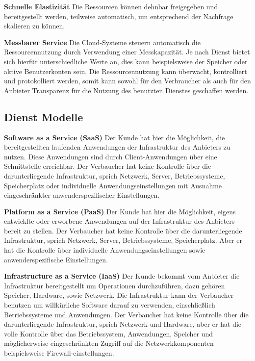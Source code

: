 \textbf{Schnelle Elastizität} \hfill
Die Ressourcen können dehnbar freigegeben und bereitgestellt werden, teilweise automatisch, um entsprechend der Nachfrage skalieren zu können\cite{nist_definition}.

\textbf{Messbarer Service} \hfill
Die Cloud-Systeme steuern automatisch die Ressourcennutzung durch Verwendung einer Messkapazität. Je nach Dienst bietet sich hierfür unterschiedliche Werte an, dies kann beispielsweise der Speicher oder aktive Benutzerkonten sein. Die Ressourcennutzung kann überwacht, kontrolliert und protokolliert werden, somit kann sowohl für den Verbraucher als auch für den Anbieter Transparenz für die Nutzung des benutzten Dienstes geschaffen werden\cite{nist_definition}.


\subsection{Dienst Modelle}
\textbf{Software as a Service (SaaS)} \hfill
Der Kunde hat hier die Möglichkeit, die bereitgestellten laufenden Anwendungen der Infrastruktur des Anbieters zu nutzen. Diese Anwendungen sind durch Client-Anwendungen über eine Schnittstelle erreichbar. Der Verbaucher hat keine Kontrolle über die darunterliegende Infrastruktur, sprich Netzwerk, Server, Betriebssysteme, Speicherplatz oder individuelle Anwendungseinstellungen mit Ausnahme eingeschränkter anwenderspezifischer Einstellungen\cite{nist_definition}.

\textbf{Platform as a Service (PaaS)} \hfill
Der Kunde hat hier die Möglichkeit, eigens entwicklte oder erworbene Anwendungen auf der Infrastruktur des Anbieters bereit zu stellen. Der Verbaucher hat keine Kontrolle über die darunterliegende Infrastruktur, sprich Netzwerk, Server, Betriebssysteme, Speicherplatz. Aber er hat die Kontrolle über individuelle Anwendungseinstellungen sowie anwenderspezifische Einstellungen\cite{nist_definition}.

\textbf{Infrastructure as a Service (IaaS)} \hfill
Der Kunde bekommt vom Anbieter die Infrastruktur bereitgestellt um Operationen durchzuführen, dazu gehören Speicher, Hardware, sowie Netzwerk. Die Infrastruktur kann der Verbaucher benutzen um willkürliche Software darauf zu verwenden, einschließlich Betriebssysteme und Anwendungen. Der Verbaucher hat keine Kontrolle über die darunterliegende Infrastruktur, sprich Netzwerk und Hardware, aber er hat die volle Kontrolle über das Betriebssystem, Anwendungen, Speicher und möglicherweise eingeschränkten Zugriff auf die Netzwerkkomponenten beispielsweise Firewall-einstellungen\cite{nist_definition}.

